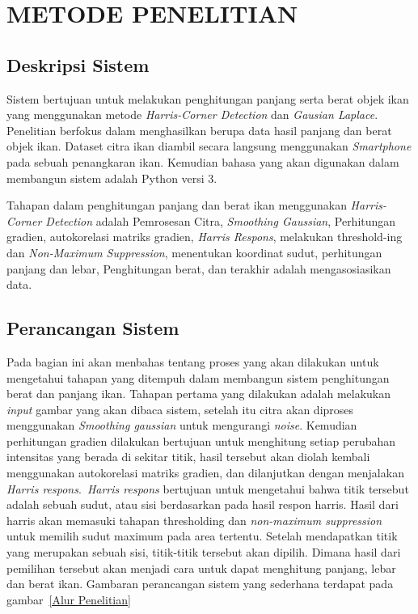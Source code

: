 
\chapter{METODE PENELITIAN}

\section{Deskripsi Sistem}
    Sistem bertujuan untuk melakukan penghitungan panjang serta berat objek ikan yang menggunakan
metode \emph{Harris-Corner Detection} dan \emph{Gausian Laplace}. Penelitian berfokus dalam menghasilkan berupa
data hasil panjang dan berat objek ikan. Dataset citra ikan diambil secara langsung menggunakan \emph{Smartphone} pada sebuah
penangkaran ikan. Kemudian bahasa yang akan digunakan dalam membangun sistem adalah Python versi 3.

Tahapan dalam penghitungan panjang dan berat ikan menggunakan \emph{Harris-Corner Detection} adalah Pemrosesan Citra,
\emph{Smoothing Gaussian}, Perhitungan gradien, autokorelasi matriks gradien, \emph{Harris Respons}, melakukan threshold-ing dan \emph{Non-Maximum Suppression}, menentukan koordinat sudut, perhitungan panjang dan lebar, Penghitungan berat,
dan terakhir adalah mengasosiasikan data.

\section{Perancangan Sistem}
    Pada bagian ini akan menbahas tentang proses yang akan dilakukan untuk mengetahui tahapan yang ditempuh
dalam membangun sistem penghitungan berat dan panjang ikan. Tahapan pertama yang dilakukan adalah melakukan \emph{input} gambar
yang akan dibaca sistem, setelah itu citra akan diproses menggunakan \emph{Smoothing gaussian} untuk mengurangi \emph{noise}. Kemudian perhitungan gradien dilakukan bertujuan untuk menghitung setiap perubahan intensitas yang berada di sekitar titik, 
hasil tersebut akan diolah kembali menggunakan autokorelasi matriks gradien, dan dilanjutkan dengan menjalakan \emph{Harris respons}.~\emph{Harris respons} bertujuan untuk mengetahui bahwa titik tersebut adalah sebuah sudut, atau sisi berdasarkan pada hasil respon harris. 
Hasil dari harris akan memasuki tahapan thresholding dan \emph{non-maximum suppression} untuk memilih sudut maximum pada area tertentu. Setelah mendapatkan titik yang merupakan sebuah sisi, titik-titik tersebut akan dipilih. 
Dimana hasil dari pemilihan tersebut akan menjadi cara untuk dapat menghitung panjang, lebar dan berat ikan. Gambaran perancangan sistem yang sederhana terdapat pada gambar~\ref*{Alur Penelitian}

